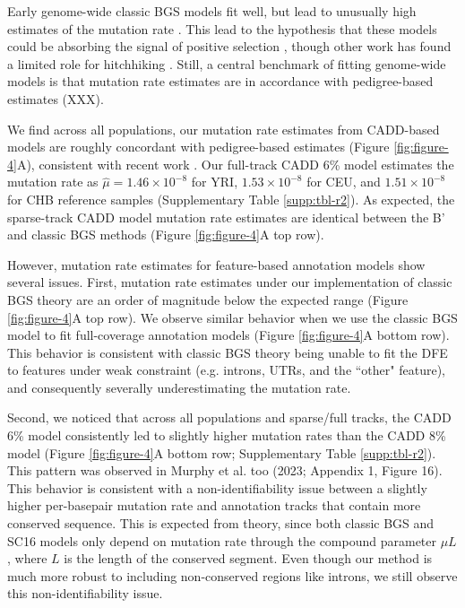 \documentclass[11pt]{article}
\begin{document}
Early genome-wide classic BGS models fit well, but lead to unusually high
estimates of the mutation rate \parencite{McVicker2009-ax}. This lead to the
hypothesis that these models could be absorbing the signal of positive
selection \parencite{Enard2014-kz}, though other work has found a limited role
for hitchhiking \parencite{Pickrell2009-tt,Hernandez2011-gs,Murphy2022}. Still,
a central benchmark of fitting genome-wide models is that mutation rate
estimates are in accordance with pedigree-based estimates (XXX). 

We find across all populations, our mutation rate estimates from CADD-based
models are roughly concordant with pedigree-based estimates (Figure
\ref{fig:figure-4}A), consistent with recent work \parencite{Murphy2022-sj}.
Our full-track CADD 6\% model estimates the mutation rate as $\widehat{\mu} =
1.46 \times 10^{-8}$ for YRI, $1.53 \times 10^{-8}$ for CEU, and $1.51 \times
10^{-8}$ for CHB reference samples (Supplementary Table \ref{supp:tbl-r2}). As
expected, the sparse-track CADD model mutation rate estimates are identical
between the B' and classic BGS methods (Figure \ref{fig:figure-4}A top row).

However, mutation rate estimates for feature-based annotation models show
several issues. First, mutation rate estimates under our implementation of
classic BGS theory are an order of magnitude below the expected range (Figure
\ref{fig:figure-4}A top row). We observe similar behavior when we use the
classic BGS model to fit full-coverage annotation models (Figure
\ref{fig:figure-4}A bottom row). This behavior is consistent with classic BGS
theory being unable to fit the DFE to features under weak constraint (e.g.
introns, UTRs, and the ``other" feature), and consequently severally
underestimating the mutation rate. 

Second, we noticed that across all populations and sparse/full tracks, the CADD
6\% model consistently led to slightly higher mutation rates than the CADD 8\%
model (Figure \ref{fig:figure-4}A bottom row; Supplementary Table
\ref{supp:tbl-r2}). This pattern was observed in Murphy et al. too (2023;
Appendix 1, Figure 16). This behavior is consistent with a non-identifiability
issue between a slightly higher per-basepair mutation rate and annotation
tracks that contain more conserved sequence. This is expected from theory,
since both classic BGS and SC16 models only depend on mutation rate through the
compound parameter $\mu L$, where $L$ is the length of the conserved segment.
Even though our method is much more robust to including non-conserved regions
like introns, we still observe this non-identifiability issue.
\end{document}
